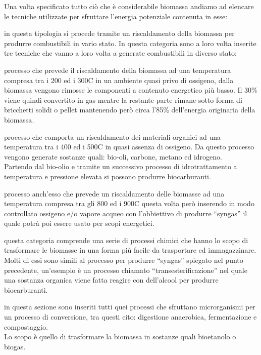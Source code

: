 \vspace{2mm}
Una volta specificato tutto ciò che è considerabile biomassa andiamo ad elencare le tecniche utilizzate per sfruttare l'energia potenziale contenuta in esse\cite{EIA2022}:
\begin{description}[labelindent=5mm]
    \item[$\bullet$ Conversione termica] in questa tipologia si procede tramite un riscaldamento della biomassa per produrre combustibili in vario stato. In questa categoria sono a loro volta inserite tre tecniche che vanno a loro volta a generate combustibili in diverso stato:
    \begin{description}[labelindent=5mm]
        \item[$\cdot$ Torrefazione:] processo che prevede il riscaldamento della biomassa ad una temperatura compresa tra i 200 ed i 300\degree C in un ambiente quasi privo di ossigeno, dalla biomassa vengono rimosse le componenti a contenuto energetico più basso. Il 30\% viene quindi convertito in gas mentre la restante parte rimane sotto forma di bricchetti solidi o pellet mantenendo però circa l'85\% dell'energia originaria della biomassa\cite{Torrification}. 
        \item[$\cdot$ Pirolisi:] processo che comporta un riscaldamento dei materiali organici ad una temperatura tra i 400 ed i 500\degree C in quasi assenza di ossigeno. Da questo processo vengono generate sostanze quali: bio-oli, carbone, metano ed idrogeno.\\
        Partendo dal bio-olio e tramite un successivo processo di idrotrattamento a temperatura e pressione elevata si possono produrre biocarburanti\cite{EIA2021}.
        \item[$\cdot$ Gassificazione:] processo anch'esso che prevede un riscaldamento delle biomasse ad una temperatura compresa tra gli 800 ed i 900\degree C questa volta però inserendo in modo controllato ossigeno e/o vapore acqueo con l'obbiettivo di produrre \enquote{syngas} il quale potrà poi essere usato per scopi energetici.\cite{EIA2022}
    \end{description}
    \item[$\bullet$ Conversione chimica] questa categoria comprende una serie di processi chimici che hanno lo scopo di trasformare le biomasse in una forma più facile da trasportare ed immagazzinare.\\
    Molti di essi sono simili al processo per produrre \enquote{syngas} spiegato nel punto precedente, un'esempio è un processo chiamato \enquote{transesterificazione} nel quale una sostanza organica viene fatta reagire con dell'alcool per produrre biocarburanti.\cite{EIA2022}
    \item[$\bullet$ Conversione biologica] in questa sezione sono inseriti tutti quei processi che sfruttano microrganismi per un processo di conversione, tra questi cito: digestione anaerobica, fermentazione e compostaggio.\\ Lo scopo è quello di trasformare la biomassa in sostanze quali bioetanolo o biogas. 
\end{description}

